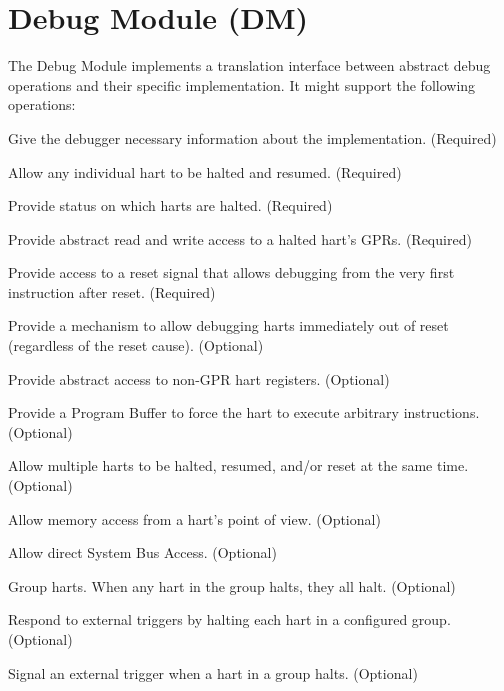 \chapter{Debug Module (DM)} \label{dm}

\begin{steps}{The Debug Module implements a translation interface between abstract debug
    operations and their specific implementation. It might support the following
    operations:}
\item Give the debugger necessary information about the implementation. (Required)
\item Allow any individual hart to be halted and resumed. (Required)
\item Provide status on which harts are halted. (Required)
\item Provide abstract read and write access to a halted hart's GPRs. (Required)
\item Provide access to a reset signal that allows debugging from the very
    first instruction after reset. (Required)
\item Provide a mechanism to allow debugging harts immediately out of reset
      (regardless of the reset cause). (Optional)
\item Provide abstract access to non-GPR hart registers. (Optional)
\item Provide a Program Buffer to force the hart to execute arbitrary instructions. (Optional)
\item Allow multiple harts to be halted, resumed, and/or reset at the same time. (Optional)
\item Allow memory access from a hart's point of view. (Optional)
\item Allow direct System Bus Access. (Optional)
\item Group harts. When any hart in the group halts, they all halt. (Optional)
\item Respond to external triggers by halting each hart in a configured group. (Optional)
\item Signal an external trigger when a hart in a group halts. (Optional)
\end{steps}

